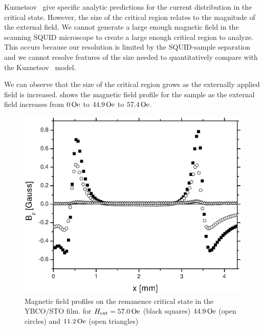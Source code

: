 Kuznetsov \etal\ give specific analytic predictions for the 
current distribution in the critical state.
However, the size of the critical region relates to the magnitude
of the external field. We cannot generate a large enough magnetic
field in the scanning SQUID microscope to create a large enough
critical region to analyze. This occurs because our resolution is
limited
by the SQUID-sample separation and we cannot resolve features
of the size needed to quantitatively 
compare with the Kuznetsov \etal\
model. 

We can observe that the size of the critical region grows as the
externally applied field is increased. 
shows the magnetic field profile for the sample as the external field
increases from $0\,\mathrm{Oe}$ to $44.9\,\mathrm{Oe}$ to $57.4\,\mathrm{Oe}$. 

%
%
\begin{figure}[p]
\includegraphics[width=5.7in]{figs/magpen/fig12.eps}
\caption[Magnetic field profiles of the remanence critical state in 
YBCO films.]{Magnetic field profiles on the remanence critical state in 
the YBCO/STO film.  for $H_{\mathrm{ext}}= 57.0\,\mathrm{Oe}$ (black squares) 
$44.9\,\mathrm{Oe}$ (open circles) and $11.2\,\mathrm{Oe}$ (open triangles) 
}
\label{fig:remanence_line_cuts}
\end{figure}

